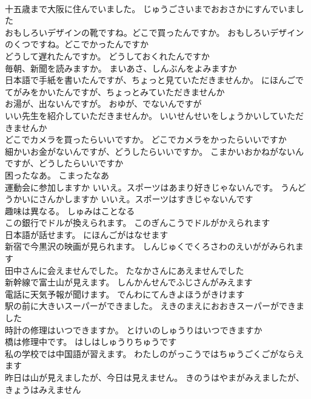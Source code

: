 \documentclass[8pt]{extreport}
\begin{document}
\begin{CJK}{UTF8}{min}
\\	十五歳まで大阪に住んでいました。	じゅうごさいまでおおさかにすんでいました 
\\	おもしろいデザインの靴ですね。どこで買ったんですか。	おもしろいデザインのくつですね。どこでかったんですか 
\\	どうして遅れたんですか。	どうしておくれたんですか 
\\	毎朝、新聞を読みますか。	まいあさ、しんぶんをよみますか 
\\	日本語で手紙を書いたんですが、ちょっと見ていただきませんか。	にほんごでてがみをかいたんですが、ちょっとみていただきませんか 
\\	お湯が、出ないんですが。	おゆが、でないんですが 
\\	いい先生を紹介していただきませんか。	いいせんせいをしょうかいしていただきませんか 
\\	どこでカメラを買ったらいいですか。	どこでカメラをかったらいいですか 
\\	細かいお金がないんですが、どうしたらいいですか。	こまかいおかねがないんですが、どうしたらいいですか 
\\	困ったなあ。	こまったなあ 
\\	運動会に参加しますか いいえ。スポーツはあまり好きじゃないんです。	うんどうかいにさんかしますか いいえ。スポーツはすきじゃないんです 
\\	趣味は異なる。	しゅみはことなる 
\\	この銀行でドルが換えられます。	このぎんこうでドルがかえられます 
\\	日本語が話せます。	にほんごがはなせます 
\\	新宿で今黒沢の映画が見られます。	しんじゅくでくろさわのえいががみられます 
\\	田中さんに会えませんでした。	たなかさんにあえませんでした 
\\	新幹線で富士山が見えます。	しんかんせんでふじさんがみえます 
\\	電話に天気予報が聞けます。	でんわにてんきよほうがきけます 
\\	駅の前に大きいスーパーができました。	えきのまえにおおきスーパーができました 
\\	時計の修理はいつできますか。	とけいのしゅうりはいつできますか 
\\	橋は修理中です。	はしはしゅうりちゅうです 
\\	私の学校では中国語が習えます。	わたしのがっこうではちゅうごくごがならえます 
\\	昨日は山が見えましたが、今日は見えません。	きのうはやまがみえましたが、きょうはみえません 

\end{CJK}
\end{document}
